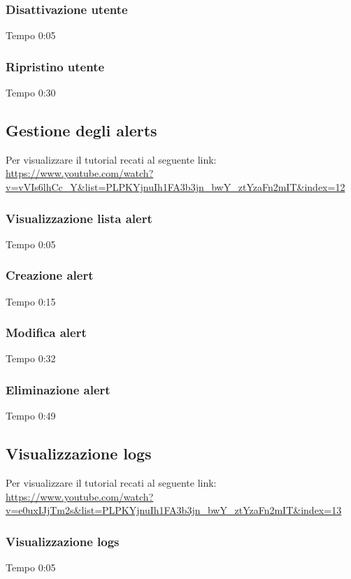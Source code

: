 	\subsubsection{Disattivazione utente}
	Tempo 0:05

	\subsubsection{Ripristino utente}
	Tempo 0:30

\subsection{Gestione degli alerts}
Per visualizzare il tutorial recati al seguente link: 
\url{https://www.youtube.com/watch?v=vVIs6lhCc_Y&list=PLPKYjnuIh1FA3b3jn_bwY_ztYzaFn2mIT&index=12}

	\subsubsection{Visualizzazione lista alert}
	Tempo 0:05

	\subsubsection{Creazione alert}
	Tempo 0:15

	\subsubsection{Modifica alert}
	Tempo 0:32

	\subsubsection{Eliminazione alert}
	Tempo 0:49

\subsection{Visualizzazione logs}
Per visualizzare il tutorial recati al seguente link: 
\url{https://www.youtube.com/watch?v=e0uxIJjTm2s&list=PLPKYjnuIh1FA3b3jn_bwY_ztYzaFn2mIT&index=13}

	\subsubsection{Visualizzazione logs}
	Tempo 0:05
